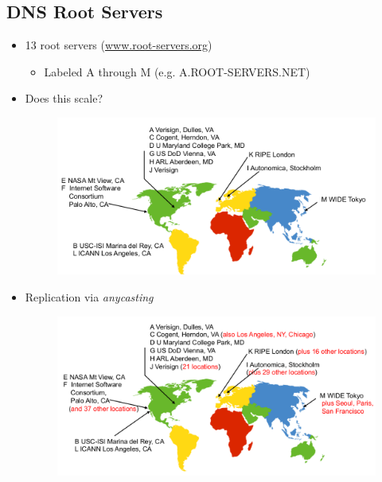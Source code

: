 \subsection{DNS Root Servers}
\begin{itemize}[nosep]
    \item 13 root servers (\url{www.root-servers.org})
          \begin{itemize}[nosep]
              \item Labeled A through M (e.g. A.ROOT-SERVERS.NET)
          \end{itemize}
    \item Does this scale?
          \begin{figure}[H]
              \includegraphics[scale=0.25]{lazy/dnsrootserver2.png}
          \end{figure}
    \item Replication via \emph{anycasting}
          \begin{figure}[H]
              \includegraphics[scale=0.25]{lazy/dnsrootserver3.png}
          \end{figure}
\end{itemize}
